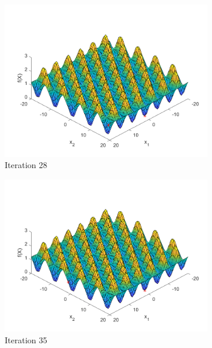 \begin{figure}
\begin{subfigure}[b]{0.4\textwidth}
   \includegraphics[width=\textwidth]{img/smpl/grwnk2d/loa-iter-28}
   \caption{Iteration 28}
   \label{fig:s7-iter-4}
 \end{subfigure}
 \begin{subfigure}[b]{0.4\textwidth}
   \includegraphics[width=\textwidth]{img/smpl/grwnk2d/loa-iter-35}
   \caption{Iteration 35}
   \label{fig:s7-iter-5}
 \end{subfigure}
 \begin{subfigure}[b]{0.4\textwidth}

\end{subfigure}
\end{figure}
